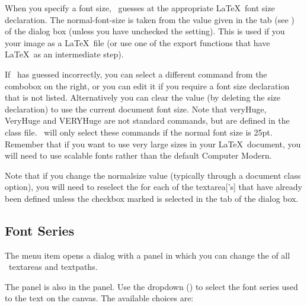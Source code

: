 When you specify a font size, \FlowframTk\ guesses at the
appropriate \LaTeX\ font size declaration. The
\gls{normal-font-size} is taken from the value given in the
 tab (see ) of
the  dialog box (unless you have unchecked the
 setting). This is used if you
 your image as a \LaTeX\ file (or use one of the
export functions that have \LaTeX\ as an intermediate step).

If \FlowframTk\ has guessed incorrectly, you can select a different
command from the \gls{combobox} on the right, or you can edit it if
you require a font size declaration that is not listed.
Alternatively you can clear the value (by deleting the size
declaration) to use the current document font size.  Note that
\gls{veryHuge}, \gls{VeryHuge} and \gls{VERYHuge} are
not standard commands, but are defined in the 
class file.  \FlowframTk\ will only select these commands if the
normal font size is 25\gls{pt}. Remember that if you want to use
very large sizes in your \LaTeX\ document, you will need to use
scalable fonts rather than the default Computer Modern.

Note that if you change the \gls{normalsize} value (typically
through a document class option), you will
need to reselect the  for each of the \gls{textarea}['s]
that have already been defined unless the \gls*{checkbox} marked
 is selected in the
 tab of the  dialog box.


\subsection{Font Series}\label{sec:fontseries}


The  menu item opens a dialog with a 
 panel in which you can change the
of all \selected\ \glspl{textarea} and \glspl{textpath}.


The  panel is also in the 
panel. Use the \gls{dropdown} () to
select the font series used to  the
text on the \gls{canvas}.
The available choices are:

